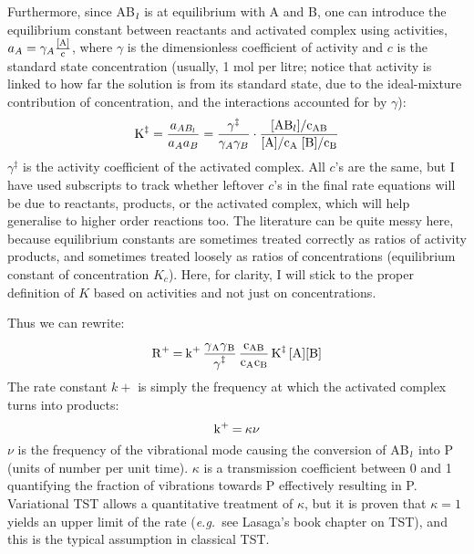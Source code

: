 \documentclass[12pt]{paper}    %
\newcommand{\eg}{\textit{e.g.}~}
\begin{document}
Furthermore, since AB$\ce{_l}$ is at equilibrium with A and B, one can introduce the  equilibrium constant between reactants and activated complex using activities, $a_A = \gamma_A \ce{\frac{[A]}{c}}$, where $\gamma$ is the dimensionless coefficient of activity and $c$ is the standard state concentration (usually, 1 mol per litre; notice that activity is linked to how far the solution is from its standard state, due to the ideal-mixture contribution of concentration, and the interactions accounted for by $\gamma$):
%
\begin{equation}
\ce{K^\ddag} = \frac{a_{AB_l}}{a_Aa_B} = \frac{\gamma^\ddag}{\gamma_A\gamma_B}\cdot\ce{\frac{[AB_l]/c_{AB}}{[A]/c_A\;[B]/c_B}}
\end{equation}
%
$\gamma^\ddag$ is the activity coefficient of the activated complex. All $c$'s are the same, but I have used subscripts to track whether leftover $c$'s in the final rate equations will be due to reactants, products, or the activated complex, which will help generalise to higher order reactions too. The literature can be quite messy here, because equilibrium constants are sometimes treated correctly as ratios of activity products, and sometimes treated loosely as ratios of concentrations (equilibrium constant of concentration $K_c$). Here, for clarity, I will stick to the proper definition of $K$ based on activities and not just on concentrations.
 
Thus we can rewrite:
%
\begin{equation}
\ce{R+ = k+ \frac{\gamma_A\gamma_B}{\gamma^\ddag} \frac{c_{AB}}{c_Ac_B} K^{\ddag} [A][B]}
\end{equation}
%
The rate constant $k+$ is simply the frequency at which the activated complex turns into products:
%
\begin{equation}
\ce{k+ = \kappa\nu }
\end{equation}
%
$\nu$ is the frequency of the vibrational mode causing the conversion of AB$\ce{_l}$ into P (units of number per unit time). $\kappa$ is a transmission coefficient between 0 and 1 quantifying the fraction of vibrations towards P effectively resulting in P. Variational TST allows a quantitative treatment of $\kappa$, but it is proven that $\kappa=1$ yields an upper limit of the rate (\eg see Lasaga's book chapter on TST), and this is the typical assumption in classical TST.
\end{document}
